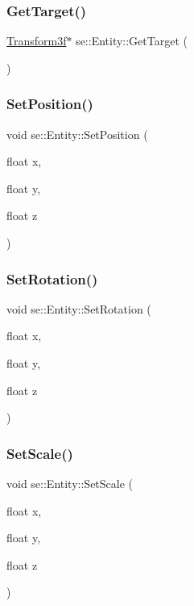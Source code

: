 \subsubsection{\texorpdfstring{Get\+Target()}{GetTarget()}}
{\footnotesize\ttfamily \mbox{\hyperlink{classse_1_1_transform3f}{Transform3f}}$\ast$ se\+::\+Entity\+::\+Get\+Target (\begin{DoxyParamCaption}{ }\end{DoxyParamCaption})}

\mbox{\label{classse_1_1_entity_a09e198e70620f231106d9f375f7598f3}} 
\subsubsection{\texorpdfstring{Set\+Position()}{SetPosition()}}
{\footnotesize\ttfamily void se\+::\+Entity\+::\+Set\+Position (\begin{DoxyParamCaption}\item[{float}]{x,  }\item[{float}]{y,  }\item[{float}]{z }\end{DoxyParamCaption})}

\mbox{\label{classse_1_1_entity_a41f820b99b2b6d76c97472dcddca7fa2}} 
\subsubsection{\texorpdfstring{Set\+Rotation()}{SetRotation()}}
{\footnotesize\ttfamily void se\+::\+Entity\+::\+Set\+Rotation (\begin{DoxyParamCaption}\item[{float}]{x,  }\item[{float}]{y,  }\item[{float}]{z }\end{DoxyParamCaption})}

\mbox{\label{classse_1_1_entity_a812b63adcbf5f1a3e429a31c6e0ff940}} 
\subsubsection{\texorpdfstring{Set\+Scale()}{SetScale()}}
{\footnotesize\ttfamily void se\+::\+Entity\+::\+Set\+Scale (\begin{DoxyParamCaption}\item[{float}]{x,  }\item[{float}]{y,  }\item[{float}]{z }\end{DoxyParamCaption})}

